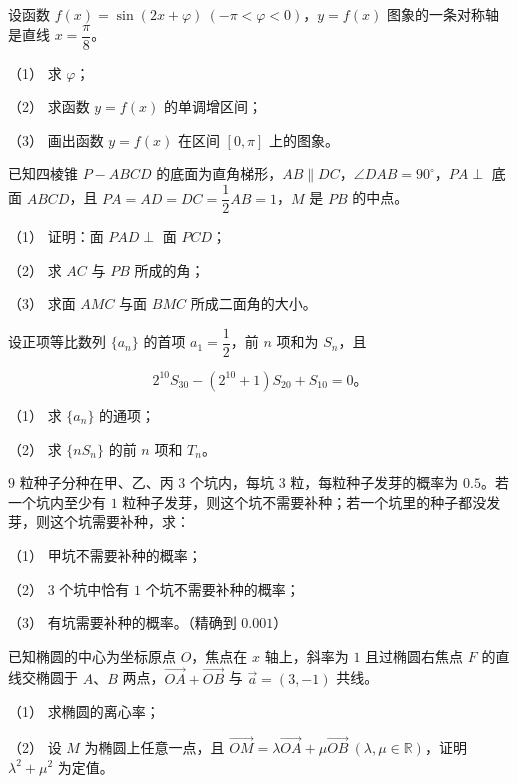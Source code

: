 \begin{question}
设函数 $f(x)=\sin(2x+\varphi)\ (-\pi<\varphi<0)$，$y=f(x)$ 图象的一条对称轴是直线 $x=\dfrac{\pi}{8}$。

（1） 求 $\varphi$；

（2） 求函数 $y=f(x)$ 的单调增区间；

（3） 画出函数 $y=f(x)$ 在区间 $[0,\pi]$ 上的图象。

\Needspace{0.4\textheight}
\end{question}
\begin{question}
已知四棱锥 $P-ABCD$ 的底面为直角梯形，$AB\parallel DC$，$\angle DAB=90^\circ$，$PA\perp$ 底面 $ABCD$，且 $PA=AD=DC=\dfrac12AB=1$，$M$ 是 $PB$ 的中点。
\nopagebreak[4]
\begin{center}\end{center}
\nopagebreak[4]
（1） 证明：面 $PAD\perp$ 面 $PCD$；

（2） 求 $AC$ 与 $PB$ 所成的角；

（3） 求面 $AMC$ 与面 $BMC$ 所成二面角的大小。

\end{question}
\begin{question}
设正项等比数列 $\{a_n\}$ 的首项 $a_1=\dfrac12$，前 $n$ 项和为 $S_n$，且

\nopagebreak[4]
\[
2^{10}S_{30}-(2^{10}+1)S_{20}+S_{10}=0\text{。}
\]

（1） 求 $\{a_n\}$ 的通项；

（2） 求 $\{nS_n\}$ 的前 $n$ 项和 $T_n$。

\end{question}
\begin{question}
$9$ 粒种子分种在甲、乙、丙 $3$ 个坑内，每坑 $3$ 粒，每粒种子发芽的概率为 $0.5$。若一个坑内至少有 $1$ 粒种子发芽，则这个坑不需要补种；若一个坑里的种子都没发芽，则这个坑需要补种，求：

（1） 甲坑不需要补种的概率；

（2） $3$ 个坑中恰有 $1$ 个坑不需要补种的概率；

（3） 有坑需要补种的概率。（精确到 $0.001$）

\end{question}
\begin{question}
已知椭圆的中心为坐标原点 $O$，焦点在 $x$ 轴上，斜率为 $1$ 且过椭圆右焦点 $F$ 的直线交椭圆于 $A\text{、}B$ 两点，$\overrightarrow{OA}+\overrightarrow{OB}$ 与 $\vec a=(3,-1)$ 共线。

（1） 求椭圆的离心率；

（2） 设 $M$ 为椭圆上任意一点，且 $\overrightarrow{OM}=\lambda\overrightarrow{OA}+\mu\overrightarrow{OB}\ (\lambda,\mu\in\mathbb R)$，证明 $\lambda^2+\mu^2$ 为定值。

\end{question}

